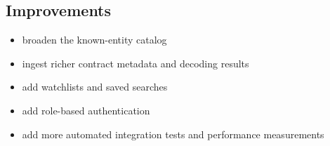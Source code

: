 \documentclass[11pt,a4paper]{article}
\begin{document}
\subsection{Improvements}

\begin{itemize}
\item broaden the known-entity catalog
\item ingest richer contract metadata and decoding results
\item add watchlists and saved searches
\item add role-based authentication
\item add more automated integration tests and performance measurements
\end{itemize}
\end{document}
